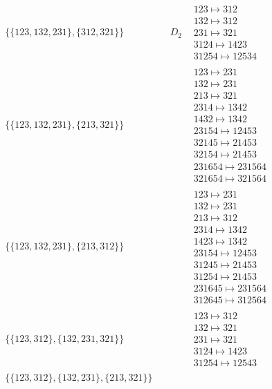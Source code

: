 \begin{tiny}
\begin{align}
\\
\{\{123, 132, 231\}, \{312, 321\}\}
\quad
&
D_2
&
\begin{matrix}
123 \mapsto 312\\132 \mapsto 312\\231 \mapsto 321\\3124 \mapsto 1423\\31254 \mapsto 12534
\end{matrix}
\\
\{\{123, 132, 231\}, \{213, 321\}\}
\quad
&
\phantom{.}
&
\begin{matrix}
123 \mapsto 231\\132 \mapsto 231\\213 \mapsto 321\\2314 \mapsto 1342\\1432 \mapsto 1342\\23154 \mapsto 12453\\32145 \mapsto 21453\\32154 \mapsto 21453\\231654 \mapsto 231564\\321654 \mapsto 321564
\end{matrix}
\\
\{\{123, 132, 231\}, \{213, 312\}\}
\quad
&
\phantom{.}
&
\begin{matrix}
123 \mapsto 231\\132 \mapsto 231\\213 \mapsto 312\\2314 \mapsto 1342\\1423 \mapsto 1342\\23154 \mapsto 12453\\31245 \mapsto 21453\\31254 \mapsto 21453\\231645 \mapsto 231564\\312645 \mapsto 312564
\end{matrix}
\\
\{\{123, 312\}, \{132, 231, 321\}\}
\quad
&
\phantom{.}
&
\begin{matrix}
123 \mapsto 312\\132 \mapsto 321\\231 \mapsto 321\\3124 \mapsto 1423\\31254 \mapsto 12543
\end{matrix}
\\
\{\{123, 312\}, \{132, 231\}, \{213, 321\}\}
\quad
&
\phantom{.}
&
\begin{matrix}

\end{matrix}
\end{align}
\end{tiny}
